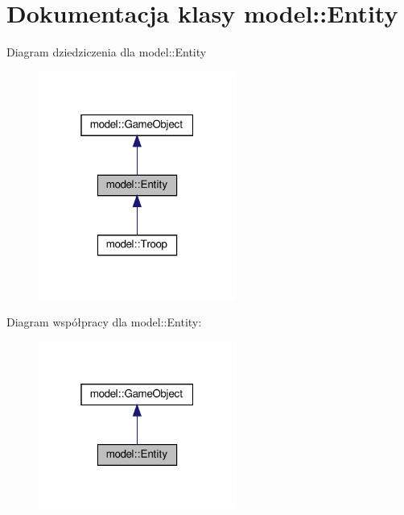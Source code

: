 \hypertarget{classmodel_1_1Entity}{}\section{Dokumentacja klasy model\+:\+:Entity}
\label{classmodel_1_1Entity}


Diagram dziedziczenia dla model\+:\+:Entity\nopagebreak
\begin{figure}[H]
\begin{center}
\leavevmode
\includegraphics[width=184pt]{classmodel_1_1Entity__inherit__graph}
\end{center}
\end{figure}


Diagram współpracy dla model\+:\+:Entity\+:\nopagebreak
\begin{figure}[H]
\begin{center}
\leavevmode
\includegraphics[width=184pt]{classmodel_1_1Entity__coll__graph}
\end{center}
\end{figure}
